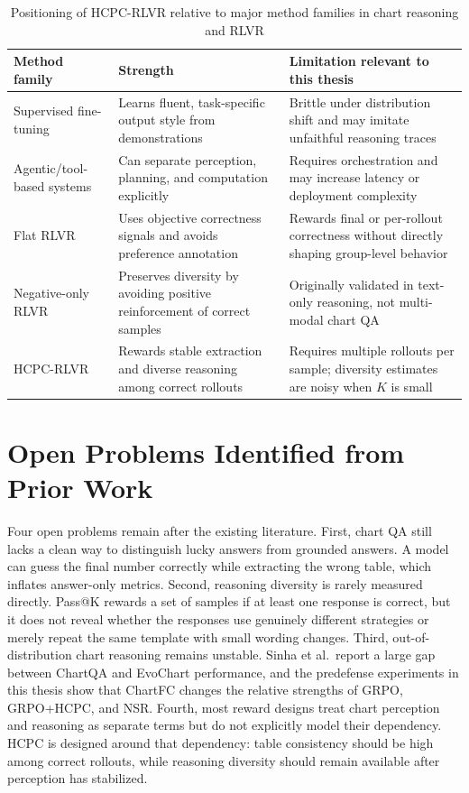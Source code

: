 \documentclass{iutbscthesis}
\begin{document}
\begin{table}[H]
    \centering
    \begin{tabular}{p{3.3cm}p{4.3cm}p{4.4cm}}
        \toprule
        Method family & Strength & Limitation relevant to this thesis \\
        \midrule
        Supervised fine-tuning & Learns fluent, task-specific output style from demonstrations & Brittle under distribution shift and may imitate unfaithful reasoning traces \\
        Agentic/tool-based systems & Can separate perception, planning, and computation explicitly & Requires orchestration and may increase latency or deployment complexity \\
        Flat RLVR & Uses objective correctness signals and avoids preference annotation & Rewards final or per-rollout correctness without directly shaping group-level behavior \\
        Negative-only RLVR & Preserves diversity by avoiding positive reinforcement of correct samples & Originally validated in text-only reasoning, not multi-modal chart QA \\
        HCPC-RLVR & Rewards stable extraction and diverse reasoning among correct rollouts & Requires multiple rollouts per sample; diversity estimates are noisy when $K$ is small \\
        \bottomrule
    \end{tabular}
    \caption{Positioning of HCPC-RLVR relative to major method families in chart reasoning and RLVR}
    \label{tab:method_families}
\end{table}

\section{Open Problems Identified from Prior Work}

Four open problems remain after the existing literature. First, chart QA still lacks a clean way to distinguish lucky answers from grounded answers. A model can guess the final number correctly while extracting the wrong table, which inflates answer-only metrics. Second, reasoning diversity is rarely measured directly. Pass@K rewards a set of samples if at least one response is correct, but it does not reveal whether the responses use genuinely different strategies or merely repeat the same template with small wording changes. Third, out-of-distribution chart reasoning remains unstable. Sinha et al.\ report a large gap between ChartQA and EvoChart performance, and the predefense experiments in this thesis show that ChartFC changes the relative strengths of GRPO, GRPO+HCPC, and NSR. Fourth, most reward designs treat chart perception and reasoning as separate terms but do not explicitly model their dependency. HCPC is designed around that dependency: table consistency should be high among correct rollouts, while reasoning diversity should remain available after perception has stabilized.
\end{document}
